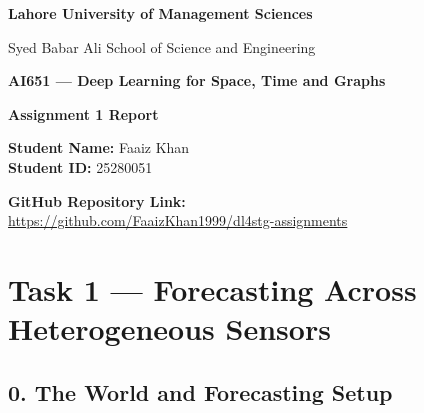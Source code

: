 \documentclass[11pt, a4paper]{article}
\begin{document}
\begin{titlepage}
    \centering
    \vspace*{2cm}
    
    {\LARGE \textbf{Lahore University of Management Sciences} \par}
    \vspace{0.5cm}
    {\Large Syed Babar Ali School of Science and Engineering \par}
    
    \vfill
    
    {\Large \textbf{AI651 --- Deep Learning for Space, Time and Graphs} \par}
    \vspace{1cm}
    {\Huge \textbf{Assignment 1 Report} \par}
    
    \vfill
    
    {\Large 
        \textbf{Student Name:} Faaiz Khan \\[0.2cm]
        \textbf{Student ID:} 25280051 
    \par}
    
    \vspace{1.5cm}
    
    {\large \textbf{GitHub Repository Link:}\\
    \vspace{0.2cm}
    \url{https://github.com/FaaizKhan1999/dl4stg-assignments} \par}
    
    \vspace*{2cm}
\end{titlepage}

\section*{Task 1 --- Forecasting Across Heterogeneous Sensors}

\subsection*{0. The World and Forecasting Setup}
\end{document}
